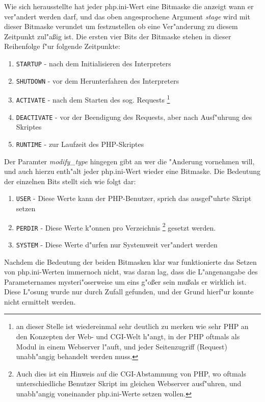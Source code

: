 Wie sich herausstellte hat jeder php.ini-Wert eine Bitmaske die anzeigt wann er ver"andert werden darf, und das oben angesprochene Argument
\emph{stage} wird mit dieser Bitmaske verundet um festzustellen ob eine Ver"anderung zu diesem Zeitpunkt zul"a\ss ig ist.
Die ersten vier Bits der Bitmaske stehen in dieser Reihenfolge f"ur folgende Zeitpunkte: 
\begin{enumerate}
\item \texttt{STARTUP} - nach dem Initialisieren des Interpreters
\item \texttt{SHUTDOWN} - vor dem Herunterfahren des Interpreters
\item \texttt{ACTIVATE} - nach dem Starten des sog. Requests 
      \footnote{an dieser Stelle ist wiedereinmal sehr deutlich zu merken wie sehr PHP an den Konzepten der Web- und CGI-Welt h"angt, in der
      PHP oftmals als Modul in einem Webserver l"auft, und jeder Seitenzugriff (Request) unabh"angig behandelt werden muss.}
\item \texttt{DEACTIVATE} - vor der Beendigung des Requests, aber nach Ausf"uhrung des Skriptes
\item \texttt{RUNTIME} - zur Laufzeit des PHP-Skriptes
\end{enumerate}
Der Paramter \emph{modify\_type} hingegen gibt an wer die "Anderung vornehmen will, und auch hierzu enth"alt jeder php.ini-Wert wieder eine Bitmaske.
Die Bedeutung der einzelnen Bits stellt sich wie folgt dar:
\begin{enumerate}
\item \texttt{USER} - Diese Werte kann der PHP-Benutzer, sprich das ausgef"uhrte Skript setzen
\item \texttt{PERDIR} - Diese Werte k"onnen pro Verzeichnis  
      \footnote{Auch dies ist ein Hinweis auf die CGI-Abstammung von PHP, wo oftmals unterschiedliche Benutzer Skript im gleichen Webserver ausf"uhren,
      und unabh"angig voneinander php.ini-Werte setzen wollen.}
      gesetzt werden.
\item \texttt{SYSTEM} - Diese Werte d"urfen nur Systemweit ver"andert werden
\end{enumerate}
Nachdem die Bedeutung der beiden Bitmasken klar war funktionierte das Setzen von php.ini-Werten immernoch nicht, was daran lag, dass die L"angenangabe
des Parameternames mysteri"oserweise um eins g"o\ss er sein mu\ss  als er wirklich ist. Diese L"osung wurde nur durch Zufall gefunden, und der
Grund hierf"ur konnte nicht ermittelt werden.

